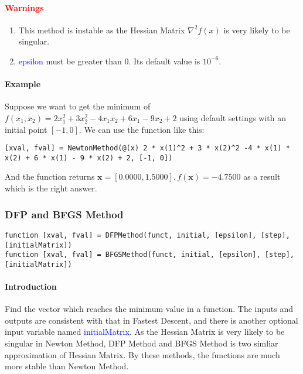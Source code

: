 \documentclass{article}
\begin{document}
\paragraph{\textcolor{red}{Warnings}}
\begin{enumerate}
    \item This method is instable as the Hessian Matrix $\nabla^2 f(x)$ is very likely to be singular.
    \item \textcolor{blue}{epsilon} must be greater than $0$. Its default value is $10^{-6}$.
\end{enumerate}

\paragraph{Example}
Suppose we want to get the minimum of $f(x_1, x_2) = 2 x_1^2 + 3 x_2^2 - 4 x_1 x_2 + 6 x_1 - 9 x_2 + 2$ using default settings with an initial point $[-1, 0]$. We can use the function like this:
\begin{verbatim}
[xval, fval] = NewtonMethod(@(x) 2 * x(1)^2 + 3 * x(2)^2 -4 * x(1) * x(2) + 6 * x(1) - 9 * x(2) + 2, [-1, 0])
\end{verbatim}

And the function returns $\mathbf{x} = [0.0000, 1.5000], f(\mathbf{x}) = -4.7500$ as a result which is the right answer.

\subsubsection{DFP and BFGS Method}
\begin{verbatim}
function [xval, fval] = DFPMethod(funct, initial, [epsilon], [step], [initialMatrix])
function [xval, fval] = BFGSMethod(funct, initial, [epsilon], [step], [initialMatrix])
\end{verbatim}

\paragraph{Introduction}
Find the vector which reaches the minimum value in a function. The inputs and outputs are consistent with that in Fastest Descent, and there is another optional input variable named \textcolor{blue}{initialMatrix}. As the Hessian Matrix is very likely to be singular in Newton Method, DFP Method and BFGS Method is two simliar approximation of Hessian Matrix. By these methods, the functions are much more stable than Newton Method.
\end{document}
